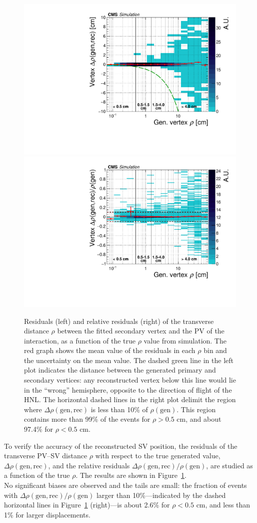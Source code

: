 \begin{figure}[h!]
  \centering
  \includegraphics[width=.48\textwidth]{Figures/c6/selection/genvtx_recvtx_Drho_vs_rho_afterSel_zoom.pdf}
  \includegraphics[width=.48\textwidth]{Figures/c6/selection/genvtx_recvtx_RelDrho_vs_rho_afterSel_zoom.pdf}
  \caption{Residuals (left) and relative residuals (right) of the
    transverse distance $\rho$ between the fitted secondary vertex and
    the PV of the interaction, as a function of the true $\rho$ value
    from simulation. 
    The red graph shows the mean value of the
    residuals in each $\rho$ bin and the uncertainty on the mean
    value. The dashed green line in the left plot indicates the
    distance between the generated primary and secondary vertices: any
    reconstructed vertex below this line would lie in the ``wrong''
    hemisphere, opposite to the direction of flight of the HNL.
    The horizontal dashed lines in the right plot delimit the region
    where $\Delta\rho(\mathrm{gen,rec})$ is less than 10\% of
    $\rho(\mathrm{gen})$. This region contains more than 99\% of
    the events for $\rho>0.5$ cm, and about 97.4\% for $\rho<0.5$ cm.
    \dani}
  \label{fig:svResidVsRho_all}
\end{figure}

To verify the accuracy of the reconstructed SV position, the residuals of the
transverse PV--SV distance $\rho$ with respect to the true generated
value, $\Delta\rho(\mathrm{gen,rec})$, and the relative residuals
$\Delta\rho(\mathrm{gen,rec})/\rho(\mathrm{gen})$, are studied as a
function of the true $\rho$. The results are shown in
Figure~\ref{fig:svResidVsRho_all}.\\
No significant biases are observed and
the tails are small: the fraction of events with
$\Delta\rho(\mathrm{gen,rec})/\rho(\mathrm{gen})$ larger than
10\%---indicated by the dashed horizontal lines in
Figure~\ref{fig:svResidVsRho_all} (right)---is about 2.6\% for
$\rho<0.5$ cm, and less than 1\% for larger
displacements.

